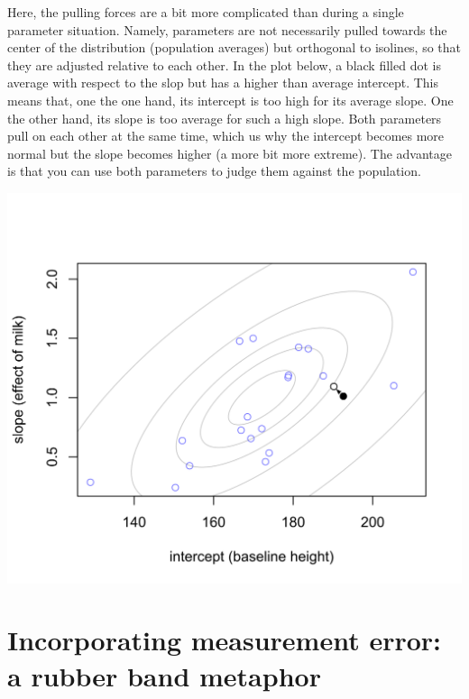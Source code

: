 \documentclass[
]{book}
\begin{document}
Here, the pulling forces are a bit more complicated than during a single parameter situation. Namely, parameters are not necessarily pulled towards the center of the distribution (population averages) but orthogonal to isolines, so that they are adjusted relative to each other. In the plot below, a black filled dot is average with respect to the slop but has a higher than average intercept. This means that, one the one hand, its intercept is too high for its average slope. One the other hand, its slope is too average for such a high slope. Both parameters pull on each other at the same time, which us why the intercept becomes more normal but the slope becomes higher (a more bit more extreme). The advantage is that you can use both parameters to judge them against the population.

\begin{center}\includegraphics[width=22.11in]{images/pooled-correlated-parameters} \end{center}

\hypertarget{incorporating-measurement-error-a-rubber-band-metaphor}{%
\chapter{Incorporating measurement error: a rubber band metaphor}\label{incorporating-measurement-error-a-rubber-band-metaphor}}
\end{document}
